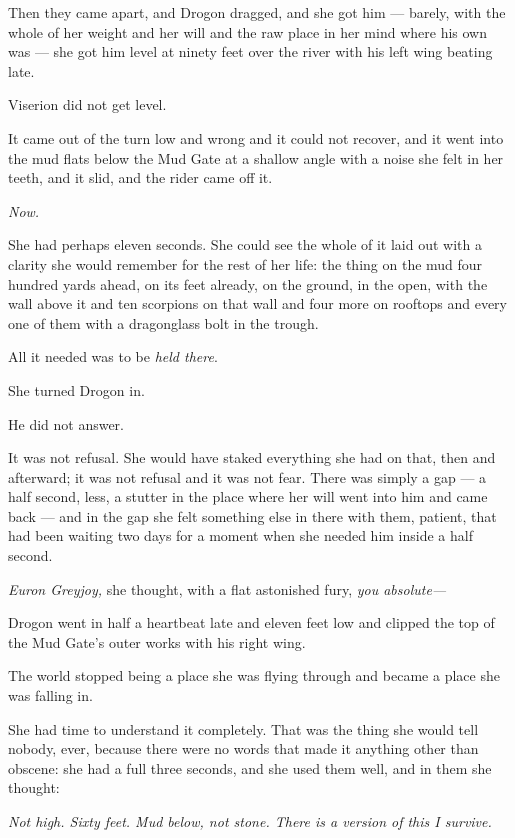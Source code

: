 Then they came apart, and Drogon dragged, and she got him — barely, with the whole of her weight and her will and the raw place in her mind where his own was — she got him level at ninety feet over the river with his left wing beating late.

Viserion did not get level.

It came out of the turn low and wrong and it could not recover, and it went into the mud flats below the Mud Gate at a shallow angle with a noise she felt in her teeth, and it slid, and the rider came off it.

\sceneBreak

\textit{Now.}

She had perhaps eleven seconds. She could see the whole of it laid out with a clarity she would remember for the rest of her life: the thing on the mud four hundred yards ahead, on its feet already, on the ground, in the open, with the wall above it and ten scorpions on that wall and four more on rooftops and every one of them with a dragonglass bolt in the trough.

All it needed was to be \textit{held there}.

She turned Drogon in.

He did not answer.

It was not refusal. She would have staked everything she had on that, then and afterward; it was not refusal and it was not fear. There was simply a gap — a half second, less, a stutter in the place where her will went into him and came back — and in the gap she felt something else in there with them, patient, that had been waiting two days for a moment when she needed him inside a half second.

\textit{Euron Greyjoy,} she thought, with a flat astonished fury, \textit{you absolute—}

Drogon went in half a heartbeat late and eleven feet low and clipped the top of the Mud Gate’s outer works with his right wing.

\sceneBreak

The world stopped being a place she was flying through and became a place she was falling in.

She had time to understand it completely. That was the thing she would tell nobody, ever, because there were no words that made it anything other than obscene: she had a full three seconds, and she used them well, and in them she thought:

\textit{Not high. Sixty feet. Mud below, not stone. There is a version of this I survive.}

